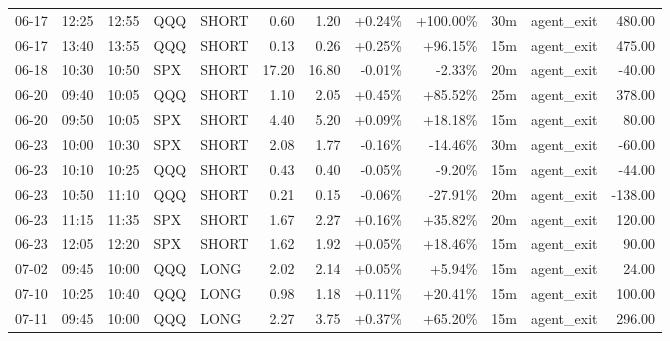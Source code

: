 \documentclass[11pt,a4paper]{article}
\begin{document}
\begin{center}
\begin{longtable}{>{\color{txtmain}}l l l l l r r r r r >{\color{txtmain}}l r}
06-17 & 12:25 & 12:55 & QQQ & SHORT & 0.60 & 1.20 & \textcolor{wingreen}{+0.24\%} & \textcolor{wingreen}{+100.00\%} & 30m & agent\_exit & \textcolor{wingreen}{480.00} \\
06-17 & 13:40 & 13:55 & QQQ & SHORT & 0.13 & 0.26 & \textcolor{wingreen}{+0.25\%} & \textcolor{wingreen}{+96.15\%} & 15m & agent\_exit & \textcolor{wingreen}{475.00} \\
06-18 & 10:30 & 10:50 & SPX & SHORT & 17.20 & 16.80 & \textcolor{lossred}{-0.01\%} & \textcolor{lossred}{-2.33\%} & 20m & agent\_exit & \textcolor{lossred}{-40.00} \\
06-20 & 09:40 & 10:05 & QQQ & SHORT & 1.10 & 2.05 & \textcolor{wingreen}{+0.45\%} & \textcolor{wingreen}{+85.52\%} & 25m & agent\_exit & \textcolor{wingreen}{378.00} \\
06-20 & 09:50 & 10:05 & SPX & SHORT & 4.40 & 5.20 & \textcolor{wingreen}{+0.09\%} & \textcolor{wingreen}{+18.18\%} & 15m & agent\_exit & \textcolor{wingreen}{80.00} \\
06-23 & 10:00 & 10:30 & SPX & SHORT & 2.08 & 1.77 & \textcolor{lossred}{-0.16\%} & \textcolor{lossred}{-14.46\%} & 30m & agent\_exit & \textcolor{lossred}{-60.00} \\
06-23 & 10:10 & 10:25 & QQQ & SHORT & 0.43 & 0.40 & \textcolor{lossred}{-0.05\%} & \textcolor{lossred}{-9.20\%} & 15m & agent\_exit & \textcolor{lossred}{-44.00} \\
06-23 & 10:50 & 11:10 & QQQ & SHORT & 0.21 & 0.15 & \textcolor{lossred}{-0.06\%} & \textcolor{lossred}{-27.91\%} & 20m & agent\_exit & \textcolor{lossred}{-138.00} \\
06-23 & 11:15 & 11:35 & SPX & SHORT & 1.67 & 2.27 & \textcolor{wingreen}{+0.16\%} & \textcolor{wingreen}{+35.82\%} & 20m & agent\_exit & \textcolor{wingreen}{120.00} \\
06-23 & 12:05 & 12:20 & SPX & SHORT & 1.62 & 1.92 & \textcolor{wingreen}{+0.05\%} & \textcolor{wingreen}{+18.46\%} & 15m & agent\_exit & \textcolor{wingreen}{90.00} \\
07-02 & 09:45 & 10:00 & QQQ & LONG & 2.02 & 2.14 & \textcolor{wingreen}{+0.05\%} & \textcolor{wingreen}{+5.94\%} & 15m & agent\_exit & \textcolor{wingreen}{24.00} \\
07-10 & 10:25 & 10:40 & QQQ & LONG & 0.98 & 1.18 & \textcolor{wingreen}{+0.11\%} & \textcolor{wingreen}{+20.41\%} & 15m & agent\_exit & \textcolor{wingreen}{100.00} \\
07-11 & 09:45 & 10:00 & QQQ & LONG & 2.27 & 3.75 & \textcolor{wingreen}{+0.37\%} & \textcolor{wingreen}{+65.20\%} & 15m & agent\_exit & \textcolor{wingreen}{296.00} \\

\end{longtable}
\end{center}
\end{document}
